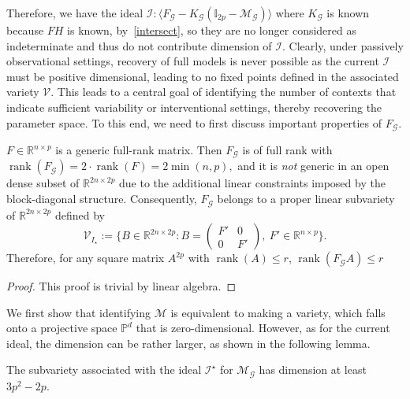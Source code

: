 \documentclass[10pt]{article}
\numberwithin{figure}{section}
\begin{document}
Therefore, we have the ideal $\mathcal{I}:\langle F_{\mathscr{G}} - K_{\mathscr{G}}(\mathbb{I}_{2p}-\mathcal{M}_{\mathscr{G}})\rangle$ where $K_{\mathscr{G}}$ is known because $FH$ is known, by~\autoref{intersect}, so they are no longer considered as indeterminate and thus do not contribute dimension of $\mathcal{I}$.  Clearly, under passively observational settings, recovery of full models is never possible as the current $\mathcal{I}$ must be positive dimensional, leading to no fixed points defined in the associated variety $\mathcal{\mathcal{V}}$.  This leads to a central goal of identifying the number of contexts that indicate sufficient variability or interventional settings, thereby recovering the parameter space. To this end, we need to first discuss important properties of $
F_{\mathscr{G }}$.
\begin{alemma}\label{genericF}
$F \in \mathbb{R}^{n \times p}$ is a generic full-rank matrix. Then $F_{\mathscr{G}}$ is of full rank with \(
\operatorname{rank}(F_{\mathscr{G}}) = 2 \cdot \operatorname{rank}(F) = 2 \min(n,p),
\) and it is \emph{not} generic in an open dense subset of $\mathbb{R}^{2n \times 2p}$ due to the additional linear constraints imposed by the block-diagonal structure. Consequently, $F_{\mathscr{G}}$ belongs to a proper linear subvariety of $\mathbb{R}^{2n \times 2p}$ defined by
\[
\mathcal{V}_{I_{\star}} := \Big\{
B \in \mathbb{R}^{2n \times 2p} : 
B = \begin{pmatrix} F' & 0 \\ 0 & F' \end{pmatrix},\ F' \in \mathbb{R}^{n \times p}
\Big\}.
\]
Therefore, for any square matrix $A^{2p}$ with $\operatorname{rank}(A)\le r$, $\operatorname{rank}(F_{\mathscr{G}}A)\le r$
\end{alemma}
\begin{proof}
    This proof is trivial by linear algebra. 
\end{proof}
We first show that identifying $\mathcal{M}$ is equivalent to making a variety, which falls onto a projective space $\mathbb{P}^{d}$ that is zero-dimensional. However, as for the current ideal, the dimension can be rather larger, as shown in the following lemma.
\begin{alemma}\label{largedim}
    The subvariety associated with the ideal $\mathcal{I}^{\star}$ for $\mathcal{M}_{\mathscr{G}}$ has dimension at least $3p^2-2p$.
\end{alemma}
\end{document}
